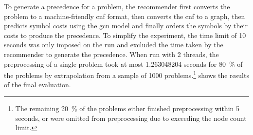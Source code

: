 To generate a precedence for a problem,
the recommender first converts the problem to a machine-friendly \gls{cnf} format,
then converts the \gls{cnf} to a graph,
then predicts symbol costs using the \gls{gcn} model
and finally orders the symbols by their costs to produce the precedence.
To simplify the experiment, the time limit of 10 seconds was only imposed on the \Vampire{} run
and excluded the time taken by the recommender to generate the precedence.
When run with 2 threads,
the preprocessing of a single problem
took at most \num[round-mode=places,round-precision=2]{1.263048204} seconds
for \SI{80}{\percent} of the problems
by extrapolation from a sample of \num{1000} problems.\footnote{The remaining \SI{20}{\percent} of the problems either finished preprocessing within 5 seconds, or were omitted from preprocessing due to exceeding the node count limit.}
 shows the results of the final evaluation.

